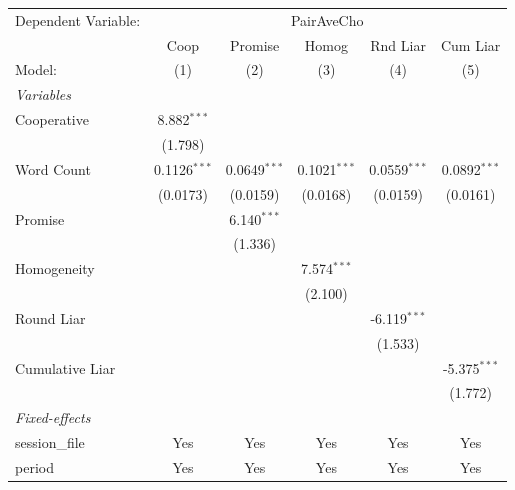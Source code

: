 
\begingroup
\centering
\begin{tabular}{lccccc}
   \tabularnewline \midrule \midrule
   Dependent Variable: & \multicolumn{5}{c}{PairAveCho}\\
                   & Coop           & Promise        & Homog          & Rnd Liar       & Cum Liar \\   
   Model:          & (1)            & (2)            & (3)            & (4)            & (5)\\  
   \midrule
   \emph{Variables}\\
   Cooperative     & 8.882$^{***}$  &                &                &                &   \\   
                   & (1.798)        &                &                &                &   \\   
   Word Count      & 0.1126$^{***}$ & 0.0649$^{***}$ & 0.1021$^{***}$ & 0.0559$^{***}$ & 0.0892$^{***}$\\   
                   & (0.0173)       & (0.0159)       & (0.0168)       & (0.0159)       & (0.0161)\\   
   Promise         &                & 6.140$^{***}$  &                &                &   \\   
                   &                & (1.336)        &                &                &   \\   
   Homogeneity     &                &                & 7.574$^{***}$  &                &   \\   
                   &                &                & (2.100)        &                &   \\   
   Round Liar      &                &                &                & -6.119$^{***}$ &   \\   
                   &                &                &                & (1.533)        &   \\   
   Cumulative Liar &                &                &                &                & -5.375$^{***}$\\   
                   &                &                &                &                & (1.772)\\   
   \midrule
   \emph{Fixed-effects}\\
   session\_file   & Yes            & Yes            & Yes            & Yes            & Yes\\  
   period          & Yes            & Yes            & Yes            & Yes            & Yes\\  

\end{tabular}
